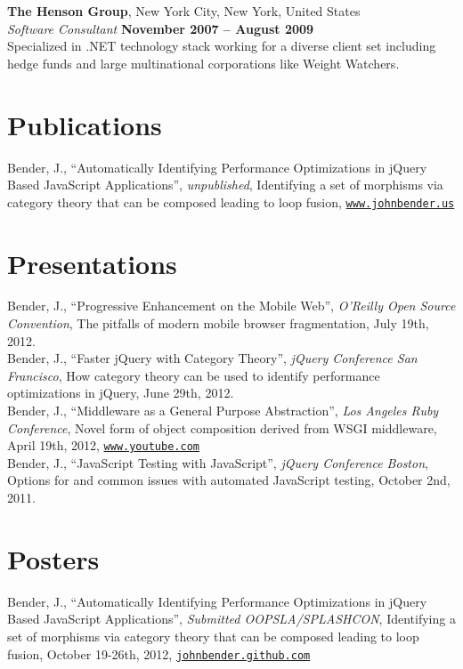 \documentclass[margin,line]{resume}
\begin{document}
\begin{resume}
  \textbf{The Henson Group}, New York City, New York, United States \vspace{1mm}\\
  \textsl{Software Consultant} \hfill \textbf{November 2007 -- August 2009}\\
  Specialized in .NET technology stack working for a diverse client set including hedge funds and large multinational corporations like Weight Watchers.

  \section{\mysidestyle Publications}
  Bender, J., ``Automatically Identifying Performance Optimizations in jQuery Based JavaScript Applications'', \textsl{unpublished}, Identifying a set of morphisms via category theory that can be composed leading to loop fusion, \href{http://johnbender.us/auto-js.pdf}{\texttt{www.johnbender.us}}

  \section{\mysidestyle Presentations}
  Bender, J., ``Progressive Enhancement on the Mobile Web'', \textsl{O'Reilly Open Source Convention}, The pitfalls of modern mobile browser fragmentation, July 19th, 2012.\vspace{2mm}\\
  Bender, J., ``Faster jQuery with Category Theory'', \textsl{jQuery Conference San Francisco}, How category theory can be used to identify performance optimizations in jQuery, June 29th, 2012. \vspace{2mm}\\
  Bender, J., ``Middleware as a General Purpose Abstraction'', \textsl{Los Angeles Ruby Conference}, Novel form of object composition derived from WSGI middleware, April 19th, 2012, \href{http://www.youtube.com/watch?feature=player_embedded&v=fcNaiP5tea0}{\texttt{www.youtube.com}}\ \vspace{2mm}\\
  Bender, J., ``JavaScript Testing with JavaScript'', \textsl{jQuery Conference Boston}, Options for and common issues with automated JavaScript testing, October 2nd, 2011.

  \section{\mysidestyle Posters}
  Bender, J., ``Automatically Identifying Performance Optimizations in jQuery Based JavaScript Applications'', \textsl{Submitted OOPSLA/SPLASHCON}, Identifying a set of morphisms via category theory that can be composed leading to loop fusion, October 19-26th, 2012, \href{http://johnbender.github.com/auto-jquery-optimization-paper/}{\texttt{johnbender.github.com}}\



\end{resume}
\end{document}
